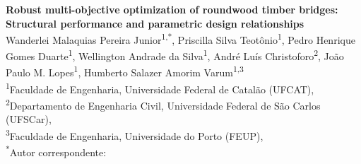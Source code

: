 \begin{center}
	{\Large\bfseries Robust multi-objective optimization of roundwood timber bridges: Structural performance and parametric design relationships}
	\\[2ex]
	
	{\small
		Wanderlei Malaquias Pereira Junior\textsuperscript{1,*},
		Priscilla Silva Teotônio\textsuperscript{1},
		Pedro Henrique Gomes Duarte\textsuperscript{1},
		Wellington Andrade da Silva\textsuperscript{1},
		André Luís Christoforo\textsuperscript{2},
		João Paulo M. Lopes\textsuperscript{1},
		Humberto Salazer Amorim Varum\textsuperscript{1,3}
	}
	\\[1ex]
	
	{\footnotesize
		\textsuperscript{1}Faculdade de Engenharia, Universidade Federal de Catalão (UFCAT),  \\[0.3ex]
		\textsuperscript{2}Departamento de Engenharia Civil, Universidade Federal de São Carlos (UFSCar),  \\[0.3ex]
		\textsuperscript{3}Faculdade de Engenharia, Universidade do Porto (FEUP), 
	}
	\\[0.8ex]
	
	{\footnotesize \textsuperscript{*}Autor correspondente: }
	
\end{center}